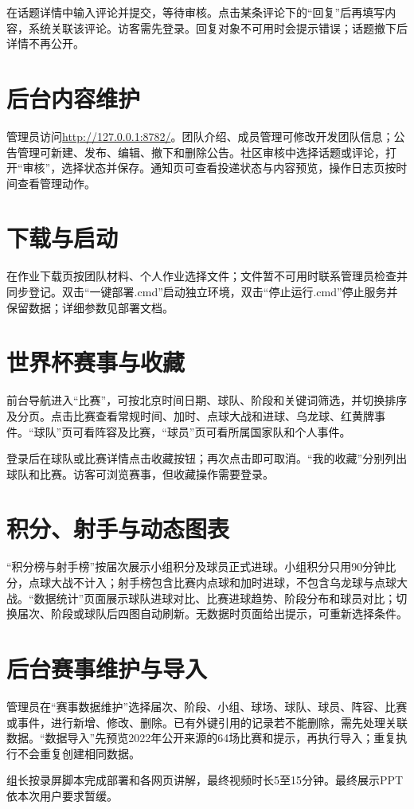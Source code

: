 \documentclass[UTF8,a4paper,11pt,fontset=windows]{ctexart}
\begin{document}
在话题详情中输入评论并提交，等待审核。点击某条评论下的“回复”后再填写内容，系统关联该评论。访客需先登录。回复对象不可用时会提示错误；话题撤下后详情不再公开。

\section{后台内容维护}
管理员访问\url{http://127.0.0.1:8782/}。团队介绍、成员管理可修改开发团队信息；公告管理可新建、发布、编辑、撤下和删除公告。社区审核中选择话题或评论，打开“审核”，选择状态并保存。通知页可查看投递状态与内容预览，操作日志页按时间查看管理动作。

\section{下载与启动}
在作业下载页按团队材料、个人作业选择文件；文件暂不可用时联系管理员检查并同步登记。双击“一键部署.cmd”启动独立环境，双击“停止运行.cmd”停止服务并保留数据；详细参数见部署文档。

\section{世界杯赛事与收藏}
前台导航进入“比赛”，可按北京时间日期、球队、阶段和关键词筛选，并切换排序及分页。点击比赛查看常规时间、加时、点球大战和进球、乌龙球、红黄牌事件。“球队”页可看阵容及比赛，“球员”页可看所属国家队和个人事件。

登录后在球队或比赛详情点击收藏按钮；再次点击即可取消。“我的收藏”分别列出球队和比赛。访客可浏览赛事，但收藏操作需要登录。

\section{积分、射手与动态图表}
“积分榜与射手榜”按届次展示小组积分及球员正式进球。小组积分只用90分钟比分，点球大战不计入；射手榜包含比赛内点球和加时进球，不包含乌龙球与点球大战。“数据统计”页面展示球队进球对比、比赛进球趋势、阶段分布和球员对比；切换届次、阶段或球队后四图自动刷新。无数据时页面给出提示，可重新选择条件。

\section{后台赛事维护与导入}
管理员在“赛事数据维护”选择届次、阶段、小组、球场、球队、球员、阵容、比赛或事件，进行新增、修改、删除。已有外键引用的记录若不能删除，需先处理关联数据。“数据导入”先预览2022年公开来源的64场比赛和提示，再执行导入；重复执行不会重复创建相同数据。

组长按录屏脚本完成部署和各网页讲解，最终视频时长5至15分钟。最终展示PPT依本次用户要求暂缓。
\end{document}
